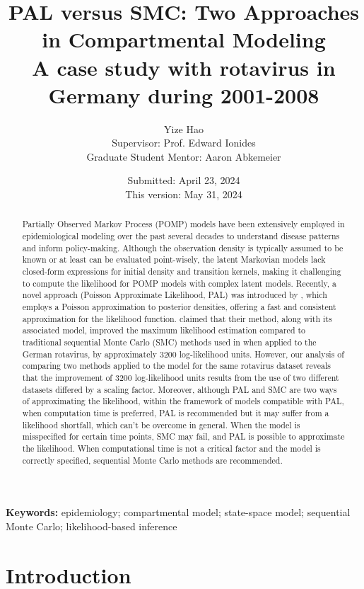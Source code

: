 \documentclass[10pt]{article}
\title{%
  \textbf{\LARGE{PAL versus SMC: Two Approaches in Compartmental Modeling}} \\
  \large A case study with rotavirus in Germany during 2001-2008 \\}
\author{\large Yize Hao\\[0.5cm]{\median Supervisor: Prof. Edward Ionides \\ 
Graduate Student Mentor: Aaron Abkemeier}
    }
\date{Submitted: April 23, 2024 \\ This version: May 31, 2024}
\begin{document}
\maketitle

\begin{abstract}
Partially Observed Markov Process (POMP) models have been extensively employed in epidemiological modeling over the past several decades to understand disease patterns and inform policy-making. Although the observation density is typically assumed to be known or at least can be evaluated point-wisely, the latent Markovian models lack closed-form expressions for initial density and transition kernels, making it challenging to compute the likelihood for POMP models with complex latent models. Recently, a novel approach (Poisson Approximate Likelihood, PAL) was introduced by \cite{wwr}, which employs a Poisson approximation to posterior densities, offering a fast and consistent approximation for the likelihood function. \cite{wwr} claimed that their method, along with its associated model, improved the maximum likelihood estimation compared to traditional sequential Monte Carlo (SMC) methods used in \cite{stocks} when applied to the German rotavirus, by approximately 3200 log-likelihood units. However, our analysis of comparing two methods applied to the model for the same rotavirus dataset reveals that the improvement of 3200 log-likelihood units results from the use of two different datasets differed by a scaling factor. Moreover, although PAL and SMC are two ways of approximating the likelihood, within the framework of models compatible with PAL, when computation time is preferred, PAL is recommended but it may suffer from a likelihood shortfall, which can't be overcome in general. When the model is misspecified for certain time points, SMC may fail, and PAL is possible to approximate the likelihood. When computational time is not a critical factor and the model is correctly specified, sequential Monte Carlo methods are recommended. 
\end{abstract}

\noindent\textbf{Keywords:} epidemiology; compartmental model; state-space model; sequential Monte Carlo; likelihood-based inference

\section{Introduction}
\end{document}
